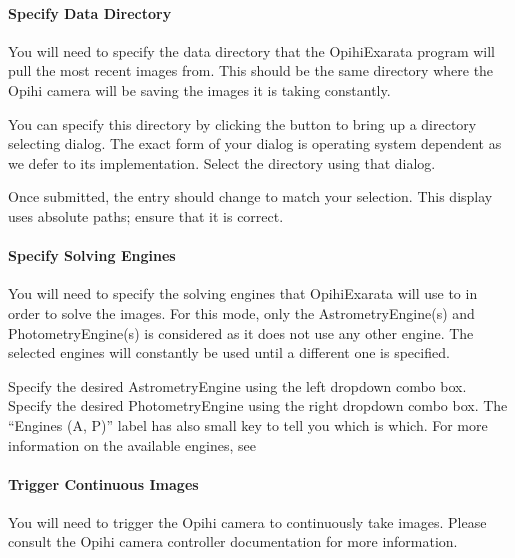 \documentclass[letterpaper,11pt,english]{sphinxmanual}
\begin{document}
\paragraph{Specify Data Directory}
\label{\detokenize{user/automatic_mode:specify-data-directory}}
\sphinxAtStartPar
You will need to specify the data directory that the OpihiExarata program will
pull the most recent images from. This should be the same directory where the
Opihi camera will be saving the images it is taking constantly.

\sphinxAtStartPar
You can specify this directory by clicking the  button to bring up
a directory selecting dialog. The exact form of your dialog is operating system
dependent as we defer to its implementation. Select the directory using that
dialog.

\sphinxAtStartPar
Once submitted, the  entry should change to match your
selection. This display uses absolute paths; ensure that it is correct.


\paragraph{Specify Solving Engines}
\label{\detokenize{user/automatic_mode:specify-solving-engines}}
\sphinxAtStartPar
You will need to specify the solving engines that OpihiExarata will use to in
order to solve the images. For this mode, only the AstrometryEngine(s) and
PhotometryEngine(s) is considered as it does not use any other engine. The
selected engines will constantly be used until a different one is specified.

\sphinxAtStartPar
Specify the desired AstrometryEngine using the left drop\sphinxhyphen{}down combo box.
Specify the desired PhotometryEngine using the right drop\sphinxhyphen{}down combo box.
The “Engines (A, P)” label has also small key to tell you which is which.
For more information on the available engines, see
{\hyperref[\detokenize{technical/architecture/services_engines:technical-architecture-services-engines}]{}}


\paragraph{Trigger Continuous Images}
\label{\detokenize{user/automatic_mode:trigger-continuous-images}}
\sphinxAtStartPar
You will need to trigger the Opihi camera to continuously take images.
Please consult the Opihi camera controller documentation for more information.
\end{document}
